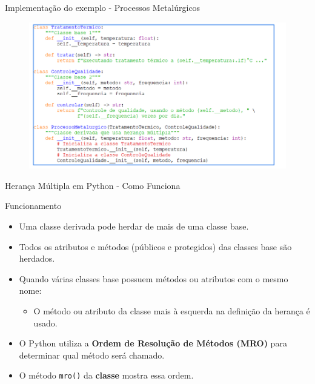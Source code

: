 \begin{frame}[fragile]{Implementação do exemplo - Processos Metalúrgicos}
    \begin{figure}
        \centering
        \includegraphics[width=0.9\linewidth]{Images/tratamento-processo-qualidade.png}


    \end{figure}

\end{frame}



\begin{frame}{Herança Múltipla em Python - Como Funciona}

    \begin{block}{Funcionamento}
        \begin{itemize}
            \item Uma classe derivada pode herdar de mais de uma classe base.
            \item Todos os atributos e métodos (públicos e protegidos) das classes base são herdados.
            \item Quando várias classes base possuem métodos ou atributos com o mesmo nome:
                  \begin{itemize}
                      \item O método ou atributo da classe mais à esquerda na definição da herança é usado.
                  \end{itemize}
            \item O Python utiliza a \textbf{Ordem de Resolução de Métodos (MRO)} para determinar qual método será chamado.
            \item O método \texttt{mro()} da \textbf{classe} mostra essa ordem.
        \end{itemize}
    \end{block}


\end{frame}

